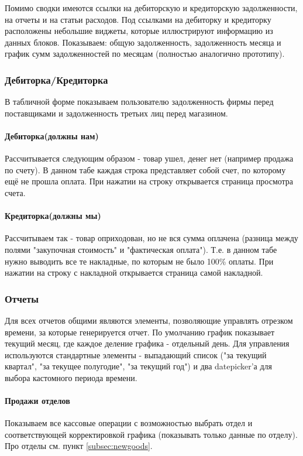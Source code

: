\documentclass[DIV=calc, paper=a4, fontsize=11pt]{scrartcl} %
\begin{document}
Помимо сводки имеются ссылки на дебиторскую и кредиторскую задолженности, на отчеты и на статьи расходов. Под ссылками на дебиторку и кредиторку расположены небольшие виджеты, которые иллюстрируют информацию из данных блоков. Показываем: общую задолженность, задолженность месяца и график сумм задолженностей по месяцам (полностью аналогично прототипу).


\subsubsection{Дебиторка/Кредиторка}

В табличной форме показываем пользователю задолженность фирмы перед поставщиками и задолженность третьих лиц перед магазином.

\paragraph{Дебиторка(должны нам)}
Рассчитывается следующим образом - товар ушел, денег нет (например продажа по счету). В данном табе каждая строка представляет собой счет, по которому ещё не прошла оплата. При нажатии на строку открывается страница просмотра счета.

\paragraph{Кредиторка(должны мы)}
Рассчитываем так - товар оприходован, но не вся сумма оплачена (разница между полями "закупочная стоимость" и "фактическая оплата"). Т.е. в данном табе нужно выводить все те накладные, по которым не было 100\% оплаты. При нажатии на строку с накладной открывается страница самой накладной.

\subsubsection{Отчеты}
Для всех отчетов общими являются элементы, позволяющие управлять отрезком времени, за которые генерируется отчет. По умолчанию график показывает текущий месяц, где каждое деление графика - отдельный день. Для управления используются стандартные элементы - выпадающий список ("за текущий квартал", "за текущее полугодие", "за текущий год") и два datepicker'а для выбора кастомного периода времени.

\paragraph{Продажи отделов}
Показываем все кассовые операции с возможностью выбрать отдел и соответствующей корректировкой графика (показывать только данные по отделу). Про отделы см. пункт \ref{subsec:newgoods}.
\end{document}
